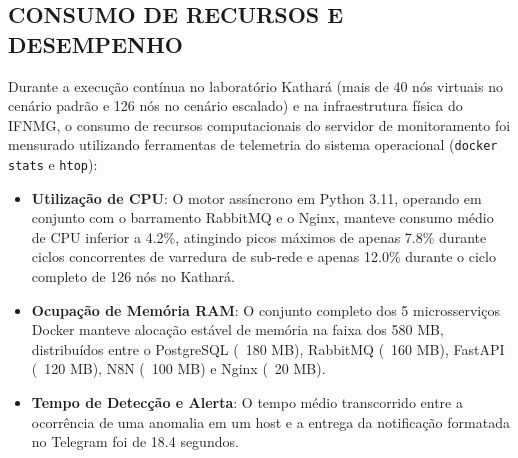 \documentclass[12pt,a4paper]{article}
\begin{document}
\subsection{CONSUMO DE RECURSOS E DESEMPENHO}
Durante a execução contínua no laboratório Kathará (mais de 40 nós virtuais no cenário padrão e 126 nós no cenário escalado) e na infraestrutura física do IFNMG, o consumo de recursos computacionais do servidor de monitoramento foi mensurado utilizando ferramentas de telemetria do sistema operacional (\texttt{docker stats} e \texttt{htop}):

\begin{itemize}[leftmargin=1.25cm]
\item \textbf{Utilização de CPU}: O motor assíncrono em Python 3.11, operando em conjunto com o barramento RabbitMQ e o Nginx, manteve consumo médio de CPU inferior a 4.2\%, atingindo picos máximos de apenas 7.8\% durante ciclos concorrentes de varredura de sub-rede e apenas 12.0\% durante o ciclo completo de 126 nós no Kathará.
\item \textbf{Ocupação de Memória RAM}: O conjunto completo dos 5 microsserviços Docker manteve alocação estável de memória na faixa dos 580 MB, distribuídos entre o PostgreSQL (~180 MB), RabbitMQ (~160 MB), FastAPI (~120 MB), N8N (~100 MB) e Nginx (~20 MB).
\item \textbf{Tempo de Detecção e Alerta}: O tempo médio transcorrido entre a ocorrência de uma anomalia em um host e a entrega da notificação formatada no Telegram foi de 18.4 segundos.
\end{itemize}
\end{document}
